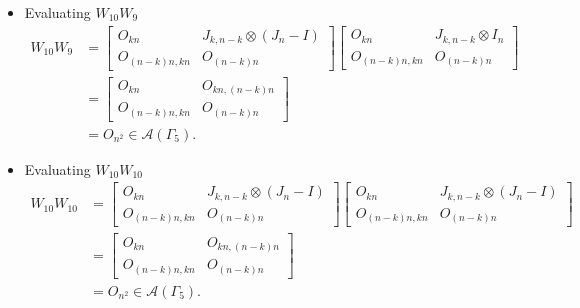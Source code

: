 \begin{itemize}
\item Evaluating $W_{10}W_{9}$
\begin{align*}
    W_{10}W_9
    &= \begin{bmatrix}
        O_{kn} & J_{k,n-k} \otimes (J_n-I) \\
        O_{(n-k)n,kn} & O_{(n-k)n}
    \end{bmatrix}
    \begin{bmatrix}
        O_{kn} & J_{k,n-k} \otimes I_n \\
        O_{(n-k)n,kn} & O_{(n-k)n}
    \end{bmatrix}\\
    &= \begin{bmatrix}
        O_{kn} & O_{kn, (n-k)n} \\
        O_{(n-k)n,kn} & O_{(n - k)n}
    \end{bmatrix}\\
    &= O_{n^2} \in\mathcal{A}(\Gamma_5).
\end{align*}

\item Evaluating $W_{10}W_{10}$
\begin{align*}
    W_{10}W_{10}
    &= \begin{bmatrix}
        O_{kn} & J_{k,n-k} \otimes (J_n-I) \\
        O_{(n-k)n,kn} & O_{(n-k)n}
    \end{bmatrix}
    \begin{bmatrix}
        O_{kn} & J_{k,n-k} \otimes (J_n-I) \\
        O_{(n-k)n,kn} & O_{(n-k)n}
    \end{bmatrix}\\
    &= \begin{bmatrix}
        O_{kn} & O_{kn, (n-k)n} \\
        O_{(n-k)n,kn} & O_{(n - k)n}
    \end{bmatrix}\\
    &= O_{n^2} \in\mathcal{A}(\Gamma_5).
\end{align*}


\end{itemize}

